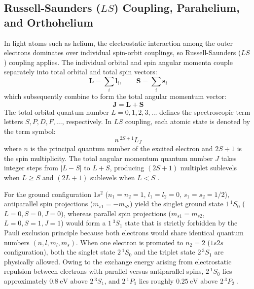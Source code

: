 \documentclass[journal]{IEEEtran}
\begin{document}
\subsection{Russell-Saunders (\texorpdfstring{$LS$}{LS}) Coupling, Parahelium, and Orthohelium}
In light atoms such as helium, the electrostatic interaction among the outer electrons dominates over individual spin-orbit couplings, so Russell-Saunders ($LS$) coupling applies. The individual orbital and spin angular momenta couple separately into total orbital and total spin vectors:
\begin{equation}
    \mathbf{L} = \sum_i \mathbf{l}_i, \qquad \mathbf{S} = \sum_i \mathbf{s}_i
    \label{eq:LS_sums}
\end{equation}
which subsequently combine to form the total angular momentum vector:
\begin{equation}
    \mathbf{J} = \mathbf{L} + \mathbf{S}
    \label{eq:J_sum}
\end{equation}
The total orbital quantum number $L = 0, 1, 2, 3, \dots$ defines the spectroscopic term letters $S, P, D, F, \dots$, respectively. In $LS$ coupling, each atomic state is denoted by the term symbol:
\begin{equation}
    n\,^{2S+1}L_J
    \label{eq:term_symbol}
\end{equation}
where $n$ is the principal quantum number of the excited electron and $2S + 1$ is the spin multiplicity. The total angular momentum quantum number $J$ takes integer steps from $|L - S|$ to $L + S$, producing $(2S + 1)$ multiplet sublevels when $L \ge S$ and $(2L + 1)$ sublevels when $L < S$ \cite{lab_manual}.

For the ground configuration $1s^2$ ($n_1 = n_2 = 1$, $l_1 = l_2 = 0$, $s_1 = s_2 = 1/2$), antiparallel spin projections ($m_{s1} = -m_{s2}$) yield the singlet ground state $1\,^{1}S_0$ ($L = 0, S = 0, J = 0$), whereas parallel spin projections ($m_{s1} = m_{s2}$, $L = 0, S = 1, J = 1$) would form a $1\,^{3}S_1$ state that is strictly forbidden by the Pauli exclusion principle because both electrons would share identical quantum numbers $(n, l, m_l, m_s)$. When one electron is promoted to $n_2 = 2$ ($1s2s$ configuration), both the singlet state $2\,^{1}S_0$ and the triplet state $2\,^{3}S_1$ are physically allowed. Owing to the exchange energy arising from electrostatic repulsion between electrons with parallel versus antiparallel spins, $2\,^{1}S_0$ lies approximately $\SI{0.8}{\electronvolt}$ above $2\,^{3}S_1$, and $2\,^{1}P_1$ lies roughly $\SI{0.25}{\electronvolt}$ above $2\,^{3}P_2$ \cite{lab_manual}.
\end{document}
